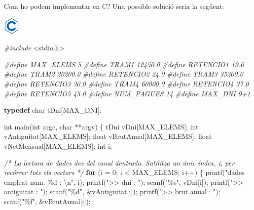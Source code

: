 \documentclass[
]{book}
\newenvironment{Shaded}{\begin{snugshade}}{\end{snugshade}}
\newcommand{\CommentTok}[1]{\textcolor[rgb]{0.56,0.35,0.01}{\textit{#1}}}
\newcommand{\ControlFlowTok}[1]{\textcolor[rgb]{0.13,0.29,0.53}{\textbf{#1}}}
\newcommand{\DataTypeTok}[1]{\textcolor[rgb]{0.13,0.29,0.53}{#1}}
\newcommand{\DecValTok}[1]{\textcolor[rgb]{0.00,0.00,0.81}{#1}}
\newcommand{\ImportTok}[1]{#1}
\newcommand{\KeywordTok}[1]{\textcolor[rgb]{0.13,0.29,0.53}{\textbf{#1}}}
\newcommand{\NormalTok}[1]{#1}
\newcommand{\PreprocessorTok}[1]{\textcolor[rgb]{0.56,0.35,0.01}{\textit{#1}}}
\newcommand{\SpecialCharTok}[1]{\textcolor[rgb]{0.00,0.00,0.00}{#1}}
\newcommand{\StringTok}[1]{\textcolor[rgb]{0.31,0.60,0.02}{#1}}
\begin{document}
Com ho podem implementar en C? Una possible solució seria la següent:

\includegraphics{./img/c.png}

\begin{Shaded}
\begin{Highlighting}[]
\PreprocessorTok{\#include }\ImportTok{\textless{}stdio.h\textgreater{}}

\PreprocessorTok{\#define MAX\_ELEMS 5}
\PreprocessorTok{\#define TRAM1 12450.0}
\PreprocessorTok{\#define RETENCIO1 19.0}
\PreprocessorTok{\#define TRAM2 20200.0}
\PreprocessorTok{\#define RETENCIO2 24.0}
\PreprocessorTok{\#define TRAM3 35200.0}
\PreprocessorTok{\#define RETENCIO3 30.0}
\PreprocessorTok{\#define TRAM4 60000.0}
\PreprocessorTok{\#define RETENCIO4 37.0}
\PreprocessorTok{\#define RETENCIO5 45.0}
\PreprocessorTok{\#define NUM\_PAGUES 14}
\PreprocessorTok{\#define MAX\_DNI 9+1}

\KeywordTok{typedef} \DataTypeTok{char}\NormalTok{ tDni[MAX\_DNI];}

\DataTypeTok{int}\NormalTok{ main(}\DataTypeTok{int}\NormalTok{ argc, }\DataTypeTok{char}\NormalTok{ **argv) \{}
\NormalTok{    tDni vDni[MAX\_ELEMS];}
    \DataTypeTok{int}\NormalTok{ vAntiguitat[MAX\_ELEMS];}
    \DataTypeTok{float}\NormalTok{ vBrutAnual[MAX\_ELEMS];}
    \DataTypeTok{float}\NormalTok{ vNetMensual[MAX\_ELEMS];}
    \DataTypeTok{int}\NormalTok{ i;}

    \CommentTok{/* La lectura de dades des del canal d\textquotesingle{}entrada.}
\CommentTok{       S\textquotesingle{}utilitza un únic índex, i, per recórrer tots els vectors */}
    \ControlFlowTok{for}\NormalTok{ (i = }\DecValTok{0}\NormalTok{; i \textless{} MAX\_ELEMS; i++) \{}
\NormalTok{        printf(}\StringTok{"dades empleat num. \%d : }\SpecialCharTok{\textbackslash{}n}\StringTok{"}\NormalTok{, i);}
\NormalTok{        printf(}\StringTok{"\textgreater{}\textgreater{} dni : "}\NormalTok{);}
\NormalTok{        scanf(}\StringTok{"\%s"}\NormalTok{, vDni[i]);}
\NormalTok{        printf(}\StringTok{"\textgreater{}\textgreater{} antiguitat : "}\NormalTok{);}
\NormalTok{        scanf(}\StringTok{"\%d"}\NormalTok{, \&vAntiguitat[i]);}
\NormalTok{        printf(}\StringTok{"\textgreater{}\textgreater{} brut anual : "}\NormalTok{);}
\NormalTok{        scanf(}\StringTok{"\%f"}\NormalTok{, \&vBrutAnual[i]);}
        

\end{Highlighting}
\end{Shaded}
\end{document}
